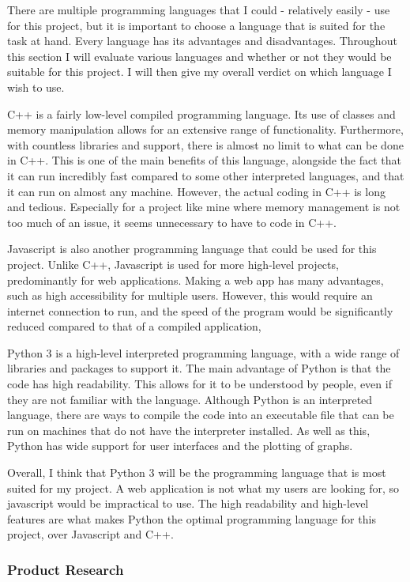 \documentclass{article}
\begin{document}
There are multiple programming languages that I could - relatively easily -  use for this project, but it is important to choose a language that is suited for the task at hand. Every language has its advantages and disadvantages. Throughout this section I will evaluate various languages and whether or not they would be suitable for this project. I will then give my overall verdict on which language I wish to use.

C++ is a fairly low-level compiled programming language. Its use of classes and memory manipulation allows for an extensive range of functionality. Furthermore, with countless libraries and support, there is almost no limit to what can be done in C++. This is one of the main benefits of this language, alongside the fact that it can run incredibly fast compared to some other interpreted languages, and that it can run on almost any machine. However, the actual coding in C++ is long and tedious. Especially for a project like mine where memory management is not too much of an issue, it seems unnecessary to have to code in C++.

Javascript is also another programming language that could be used for this project. Unlike C++, Javascript is used for more high-level projects, predominantly for web applications.  Making a web app has many advantages, such as high accessibility for multiple users. However, this would require an internet connection to run, and the speed of the program would be significantly reduced compared to that of a compiled application,

Python 3 is a high-level interpreted programming language, with a wide range of libraries and packages to support it. The main advantage of Python is that the code has high readability. This allows for it to be understood by people, even if they are not familiar with the language. Although Python is an interpreted language, there are ways to compile the code into an executable file that can be run on machines that do not have the interpreter installed. As well as this, Python has wide support for user interfaces and the plotting of graphs.

Overall, I think that Python 3 will be the programming language that is most suited for my project. A web application is not what my users are looking for, so javascript would be impractical to use. The high readability and high-level features are what makes Python the optimal programming language for this project, over Javascript and C++.

\subsubsection{Product Research}
\end{document}
